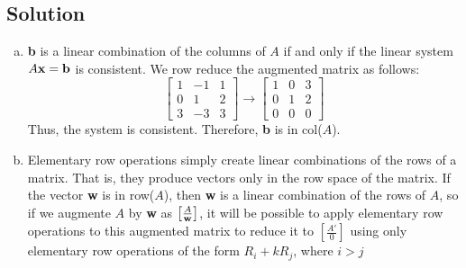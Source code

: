 \subsection*{Solution}
\begin{enumerate}[(a)]
    \item \textbf{b} is a linear combination of the columns of $A$ if and only if the linear system $A\mathbf{x}=\mathbf{b}$ is consistent.
          We row reduce the augmented matrix as follows: \[\left[\begin{array}{cc|c}
                      1 & -1 & 1 \\
                      0 & 1  & 2 \\
                      3 & -3 & 3
                  \end{array}\right]\to \left[\begin{array}{cc|c}
                      1 & 0 & 3 \\
                      0 & 1 & 2 \\
                      0 & 0 & 0
                  \end{array}\right]\]
          Thus, the system is consistent. Therefore, \textbf{b} is in col($A$).
    \item Elementary row operations simply create linear combinations of the rows of a matrix.
          That is, they produce vectors only in the row space of the matrix. If the vector \textbf{w}
          is in row($A$), then \textbf{w} is a linear combination of the rows of $A$, so if we augmente
          $A$ by \textbf{w} as $\left[\frac{A}{\mathbf{w}}\right]$, it will be possible to apply elementary row
          operations to this augmented matrix to reduce it to $\left[\frac{A'}{0}\right]$ using only
          elementary row operations of the form $R_i+kR_j$, where $i>j$


\end{enumerate}
